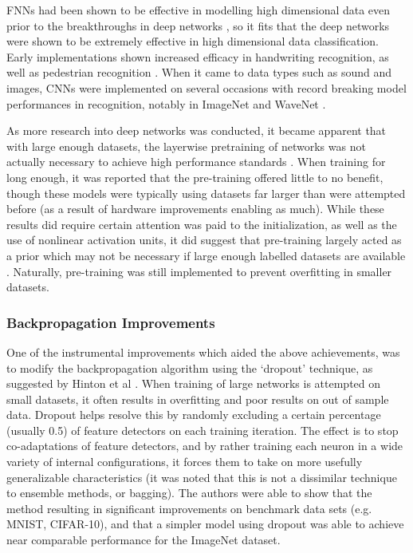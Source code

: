\documentclass[a4paper,latin]{paper}
\begin{document}
FNNs had been shown to be effective in modelling high dimensional data even prior to the breakthroughs in 
deep networks \cite{Bengio2}, so it fits that the deep networks were shown to be extremely effective in high dimensional 
data classification. Early implementations shown increased efficacy in handwriting recognition, as well as pedestrian 
recognition \cite{Sermanet}. When it came to data types such as sound and images, CNNs were implemented on several 
occasions with record breaking model performances in recognition, notably in ImageNet and WaveNet \cite{ImageNet, WaveNet}.
\hfill \break 

As more research into deep networks was conducted, it became apparent that with large enough datasets, the
 layerwise pretraining of networks was not actually necessary to achieve high performance standards 
 \cite{ImageNet, Glorot2, Ciresan}. When training for long enough, it was reported that the pre-training offered little to no 
 benefit, though these models were typically using datasets far larger than were attempted before (as a result of
  hardware improvements enabling as much). While these results did require certain attention was paid to the 
  initialization, as well as the use of nonlinear activation units, it did suggest that pre-training largely acted as a prior 
  which may not be necessary if large enough labelled datasets are available \cite{Bengio3}. Naturally, pre-training was still 
  implemented to prevent overfitting in smaller datasets.
\hfill \break 

\subsubsection{Backpropagation Improvements}

One of the instrumental improvements which aided the above achievements, was to modify the backpropagation 
algorithm using the ‘dropout’ technique, as suggested by Hinton et al \cite{Hinton4}. When training of large networks is 
attempted on small datasets, it often results in overfitting and poor results on out of sample data. Dropout helps 
resolve this by randomly excluding a certain percentage (usually 0.5) of feature detectors on each training iteration. 
The effect is to stop co-adaptations of feature detectors, and by rather training each neuron in a wide variety of 
internal configurations, it forces them to take on more usefully generalizable characteristics (it was noted that this
is not a dissimilar technique to ensemble methods, or bagging). The authors were able to show that the method
resulting in significant improvements on benchmark data sets (e.g. MNIST, CIFAR-10), and that a simpler model 
using dropout was able to achieve near comparable performance for the ImageNet dataset.
\hfill \break 
\end{document}
